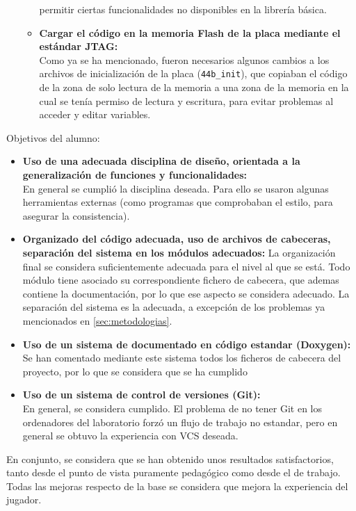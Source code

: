 \documentclass[12pt,letterpaper]{article}
\begin{document}
\begin{itemize}
\begin{itemize}
    permitir ciertas funcionalidades no disponibles en la librería
    básica.
  \item \textbf{Cargar el código en la memoria Flash de la placa
    mediante el estándar JTAG:}\\ Como ya se ha mencionado, fueron
    necesarios algunos cambios a los archivos de inicialización de la
    placa (\texttt{44b\_init}), que copiaban el código de la zona de
    solo lectura de la memoria a una zona de la memoria en la cual se
    tenía permiso de lectura y escritura, para evitar problemas al
    acceder y editar variables.
  \end{itemize}
\end{itemize}

Objetivos del alumno:
\begin{itemize}
\item \textbf{Uso de una adecuada disciplina de diseño, orientada a la
  generalización de funciones y funcionalidades:}\\ En general se
  cumplió la disciplina deseada. Para ello se usaron algunas
  herramientas externas (como programas que comprobaban el estilo,
  para asegurar la consistencia).
\item \textbf{Organizado del código adecuada, uso de archivos de
  cabeceras, separación del sistema en los módulos adecuados:} La
  organización final se considera suficientemente adecuada para el
  nivel al que se está. Todo módulo tiene asociado su correspondiente
  fichero de cabecera, que ademas contiene la documentación, por lo
  que ese aspecto se considera adecuado. La separación del sistema es
  la adecuada, a excepción de los problemas ya mencionados en
  \ref{sec:metodologias}.
\item \textbf{Uso de un sistema de documentado en código estandar
  (Doxygen):}\\ Se han comentado mediante este sistema todos los
  ficheros de cabecera del proyecto, por lo que se considera que se ha
  cumplido
\item \textbf{Uso de un sistema de control de versiones (Git):}\\ En
  general, se considera cumplido. El problema de no tener Git en los
  ordenadores del laboratorio forzó un flujo de trabajo no estandar,
  pero en general se obtuvo la experiencia con VCS deseada.
\end{itemize}

En conjunto, se considera que se han obtenido unos resultados
satisfactorios, tanto desde el punto de vista puramente pedagógico
como desde el de trabajo. Todas las mejoras respecto de la base se
considera que mejora la experiencia del jugador.
\end{document}
